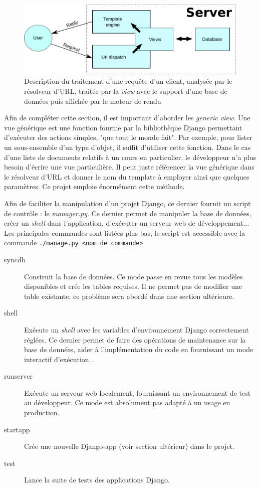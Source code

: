 \documentclass[a4paper,12pt]{article}
\begin{document}
\begin{figure}
  \centering\includegraphics[scale=0.8]{imgs/mvc.pdf}
  \caption{Description du traitement d'une requête d'un client, analysée par
           le résolveur d'URL, traitée par la \textit{view} avec le support
           d'une base de données puis affichée par le moteur de rendu}
  \label{fig:mvc}
\end{figure}

Afin de compléter cette section, il est important d'aborder les \textit{generic view}.
Une vue générique est une fonction fournie par la bibliothèque Django permettant
d'exécuter des actions simples, "que tout le monde fait". Par exemple, pour lister
un sous-ensemble d'un type d'objet, il suffit d'utiliser cette fonction. Dans
le cas d'une liste de documents relatifs à un cours en particulier, le développeur
n'a plus besoin d'écrire une vue particulière. Il peut juste référencer la vue
générique dans le résolveur d'URL et donner le nom du template à employer
ainsi que quelques paramètres. Ce projet emploie énormément cette méthode. 

Afin de faciliter la manipulation d'un projet Django, ce dernier fournit un script
de contrôle : le \textit{manager.py}. Ce dernier permet de manipuler la base de
données, créer un \textit{shell} dans l'application, d'exécuter un serveur
web de développement... Les principales commandes sont listées plus bas, le
script est accessible avec la commande \texttt{./manage.py <nom de commande>}.

\begin{description}
\item[syncdb] Construit la base de données. Ce mode passe en revue tous les modèles
              disponibles et crée les tables requises. Il ne permet pas de modifier
              une table existante, ce problème sera abordé dans une section ultérieure.
\item[shell] Exécute un \textit{shell} avec les variables d'environnement Django
             correctement réglées. Ce dernier permet de faire des opérations de maintenance
             sur la base de données, aider à l'implémentation du code en fournissant
             un mode interactif d'exécution...
\item[runserver] Exécute un serveur web localement, fournissant un environnement
             de test au développeur. Ce mode est absolument pas adapté à un usage en production.
\item[startapp] Crée une nouvelle Django-app (voir section ultérieur) dans le projet.
\item[test] Lance la suite de tests des applications Django.
\end{description}
\end{document}
